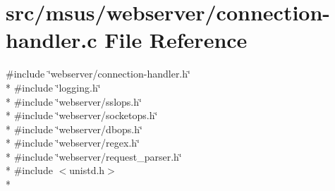 \hypertarget{connection-handler_8c}{\section{src/msus/webserver/connection-\/handler.c File Reference}
\label{connection-handler_8c}
}
{\ttfamily \#include \char`\"{}webserver/connection-\/handler.\-h\char`\"{}}\\*
{\ttfamily \#include \char`\"{}logging.\-h\char`\"{}}\\*
{\ttfamily \#include \char`\"{}webserver/sslops.\-h\char`\"{}}\\*
{\ttfamily \#include \char`\"{}webserver/socketops.\-h\char`\"{}}\\*
{\ttfamily \#include \char`\"{}webserver/dbops.\-h\char`\"{}}\\*
{\ttfamily \#include \char`\"{}webserver/regex.\-h\char`\"{}}\\*
{\ttfamily \#include \char`\"{}webserver/request\-\_\-parser.\-h\char`\"{}}\\*
{\ttfamily \#include $<$unistd.\-h$>$}\\*
